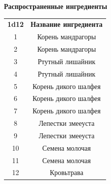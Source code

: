 \documentclass[a4paper, 9pt, twocolumn]{book}
\begin{document}
	\begin{table}[H]
		
		{\Large \textbf{Распространенные ингредиенты}}
		
		\medspace 
		
		\centering 
		
		\begin{tabularx}{\linewidth}{c C}
			
			\textbf{1d12}& \textbf{Название ингредиента} \\
			
			1 & Корень мандрагоры \\
			
			2 & Корень мандрагоры \\
			
			3 & Ртутный лишайник \\
			
			4 & Ртутный лишайник  \\
			
			5 & Корень дикого шалфея  \\
			
			6 & Корень дикого шалфея \\
			
			7 & Корень дикого шалфея  \\
			
			8 & Лепестки змееуста \\
			
			9 & Лепестки змееуста  \\
			
			10 & Семена молочая \\
			
			11 & Семена молочая  \\
			
			12 & Кровьтрава  \\ %
			
		\end{tabularx}
	\end{table}
\end{document}
